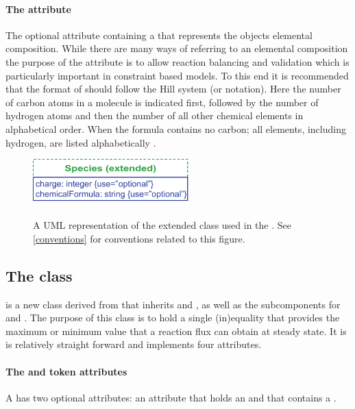 \paragraph{The  attribute}
\label{chemicalFormula-attribute}
The optional attribute  containing a 
 that represents the \Species objects elemental 
composition.
%
%
While there are many ways of referring to an elemental composition the 
purpose of the  attribute is to allow reaction 
balancing and validation which is particularly important in constraint based 
models. To this end it is recommended that the format of 
 should follow the Hill system (or notation). Here 
the number of carbon atoms in a molecule is indicated first, followed by the 
number of hydrogen atoms and then the number of all other chemical elements 
in alphabetical order. When the formula contains no carbon; all elements, 
including hydrogen, are listed alphabetically \cite{hillsystem, 
hillwikipedia}.
%
\begin{figure}[h]
  \centering
  \includegraphics[width=6cm]{images/fbc_uml_species.pdf}\\
  \caption{A UML representation of the extended \SBML \Species class used in
  the \FBCPackage. See \ref{conventions} for conventions related to this
  figure.}
  \label{fig:fbc_uml_species}
\end{figure}


\subsection{The \FBC {} class}
\label{fluxbound-class}

\FluxBound is a new \FBC class derived from \SBML \SBase that inherits
 and , as well as the subcomponents for
\Annotation and \Notes. The purpose of this class is to hold a single
(in)equality that provides the maximum or minimum value that a reaction flux
can obtain at steady state. It is is relatively straight forward and
implements four attributes.

\paragraph{The  and token  attributes}
A \FluxBound has two optional attributes:  an attribute that holds
an  and  that contains a .

